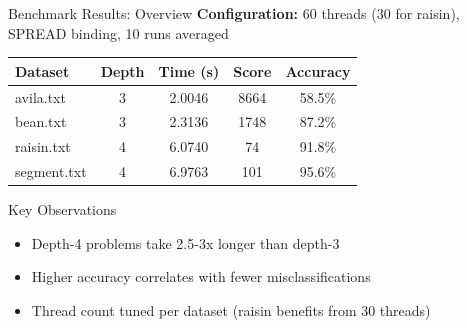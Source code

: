 \documentclass{beamer}
\begin{document}
\begin{frame}{Benchmark Results: Overview}
\textbf{Configuration:} 60 threads (30 for raisin), SPREAD binding, 10 runs averaged

\vspace{0.3em}
\begin{table}
\centering
\small
\begin{tabular}{|l|c|c|c|c|}
\hline
\textbf{Dataset} & \textbf{Depth} & \textbf{Time (s)} & \textbf{Score} & \textbf{Accuracy} \\
\hline
avila.txt & 3 & 2.0046 & 8664 & 58.5\% \\
\hline
bean.txt & 3 & 2.3136 & 1748 & 87.2\% \\
\hline
raisin.txt & 4 & 6.0740 & 74 & 91.8\% \\
\hline
segment.txt & 4 & 6.9763 & 101 & 95.6\% \\
\hline
\end{tabular}
\end{table}

\vspace{0.3em}
\begin{block}{Key Observations}
\begin{itemize}
    \item Depth-4 problems take 2.5-3x longer than depth-3
    \item Higher accuracy correlates with fewer misclassifications
    \item Thread count tuned per dataset (raisin benefits from 30 threads)
\end{itemize}
\end{block}
\end{frame}
\end{document}
